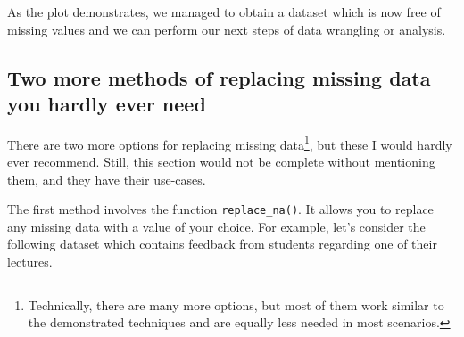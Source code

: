 \documentclass[
  letterpaper,
]{krantz}
\begin{document}
\begin{figure}[H]


\caption{\label{fig-mapping-missing-data-imputed-data}}

\end{figure}%

As the plot demonstrates, we managed to obtain a dataset which is now
free of missing values and we can perform our next steps of data
wrangling or analysis.

\subsection{Two more methods of replacing missing data you hardly ever
need}\label{sec-two-more-methods-of-replacing-missing-data}

There are two more options for replacing missing data\footnote{Technically,
  there are many more options, but most of them work similar to the
  demonstrated techniques and are equally less needed in most scenarios.},
but these I would hardly ever recommend. Still, this section would not
be complete without mentioning them, and they have their use-cases.

The first method involves the function \texttt{replace\_na()}. It allows
you to replace any missing data with a value of your choice. For
example, let's consider the following dataset which contains feedback
from students regarding one of their lectures.
\end{document}
